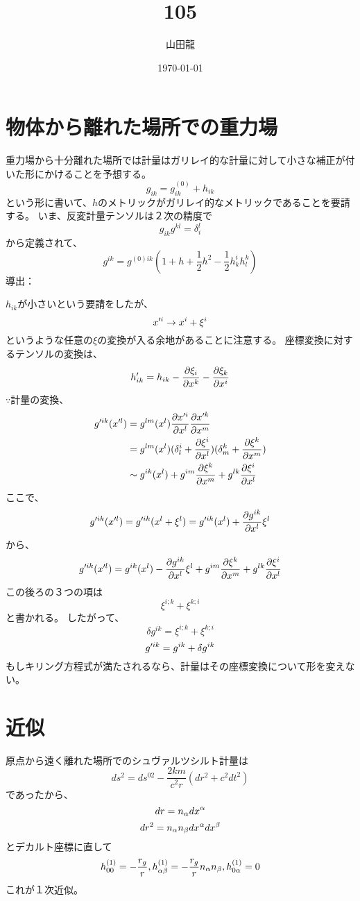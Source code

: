 \documentclass[twocolumn]{jsarticle}
\date{\today}
\author{山田龍}
\title{105}
\newcommand{\pder}[2][]{\frac{\partial#1}{\partial#2}}
\newcommand{\pderx}[2][]{\pder[#1]{x^{#2}}}
\newcommand{\pderxx}[2][]{\pder[x^{#1}]{x^{#2}}}
\newcommand{\pderugx}[2][]{\pderx[g^{#1}]{#2}}
\newcommand{\half}{\frac{1}{2}}
\newcommand{\beq}{\begin{equation}}
\newcommand{\eeq}{\end{equation}}
\begin{document}
\maketitle
\section{物体から離れた場所での重力場}
重力場から十分離れた場所では計量はガリレイ的な計量に対して小さな補正が付いた形にかけることを予想する。
\beq
g_{ik} = g^{(0)}_{ik} + h_{ik}
\eeq
という形に書いて、$h$のメトリックがガリレイ的なメトリックであることを要請する。
いま、反変計量テンソルは２次の精度で
\beq
    g_{ik}g^{kl} = \delta^l_i
\eeq
から定義されて、
\beq
g^{ik} = g^{(0)ik}(1 + h +\half h^2-\half h^i_k h^k_l)
\eeq
導出：

$h_{ik}$が小さいという要請をしたが、
\beq
    x^{\pr i} \rightarrow x^i + \xi^i
\eeq
というような任意の$\xi$の変換が入る余地があることに注意する。
座標変換に対するテンソルの変換は、
\beq
h^{\pr}_{ik} = h_{ik} - \pder[\xi_i]{x^k} - \pder[\xi_k]{x^i} 
\eeq
$\because$計量の変換、
\begin{align}
    g^{\pr ik}(x^{\pr l}) &= g^{lm}(x^l) \pderxx[\pr i]{l} \pderxx[\pr k]{m}\\
                          &= g^{lm}(x^l)(\delta^i_l + \pderx[\xi^i]{l})(\delta^k_m + \pderx[\xi^k]{m})\\
                          &\sim g^{ik}(x^l) + g^{im}\pderx[\xi^k]{m}+ g^{lk}\pderx[\xi^i]{l}
\end{align}
ここで、
\beq
g^{\pr ik}(x^{\pr l}) =  g^{\pr ik}(x^l + \xi^l) = g^{\pr ik}(x^l) + \pderugx[ik]{l}\xi^l
\eeq
から、
\beq
g^{\pr ik}(x^{\pr l}) = g^{ik}(x^l) - \pderugx[ik]{l}\xi^l + g^{im}\pderx[\xi^k]{m}+ g^{lk}\pderx[\xi^i]{l}
\eeq
この後ろの３つの項は
\beq
    \xi^{i;k} + \xi^{k;i}
\eeq
と書かれる。
したがって、
\beq
\delta g^{ik} = \xi^{i;k} + \xi^{k;i}
\eeq
\beq
    g^{\pr ik} = g^{ik} + \delta g^{ik}
\eeq
もしキリング方程式が満たされるなら、計量はその座標変換について形を変えない。
\section{近似}
原点から遠く離れた場所でのシュヴァルツシルト計量は
\beq
    ds^2 = ds^{0 2} - \frac{2km}{c^2r}(dr^2 + c^2dt^2)
\eeq
であったから、
\beq
dr = n_\al dx^\al
\eeq
\beq
dr^2 = n_\al n_\be dx^\al dx^\be
\eeq
とデカルト座標に直して
\beq
h^{(1)}_{00} = -\frac{r_g}{r},h^{(1)}_{\al \be} = -\frac{r_g}{r}n_\al n_\be,h^{(1)}_{0 \al} = 0
\eeq
これが１次近似。
\end{document}
